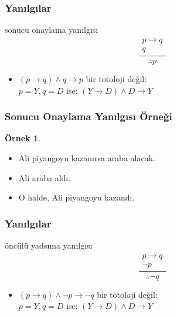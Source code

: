 \documentclass[dvipsnames]{beamer}
\theoremstyle{definition}
\theoremstyle{example}
\newtheorem{ornek}[theorem]{Örnek}
\theoremstyle{plain}
\begin{document}
\begin{frame}
  \frametitle{Yanılgılar}

  \begin{block}{sonucu onaylama yanılgısı}
    \[
    \frac
      {
      \begin{array}{c}
        p \rightarrow q\\
        q
        \end{array}
      }
      {
        \therefore p
      }
    \]
  \end{block}

  \pause
  \begin{itemize}
    \item $(p \rightarrow q) \wedge q \rightarrow p$ bir totoloji değil:\\
      $p=Y,q=D$ ise: $(Y \rightarrow D) \wedge D \rightarrow Y$
  \end{itemize}
\end{frame}

\begin{frame}
  \frametitle{Sonucu Onaylama Yanılgısı Örneği}

  \begin{ornek}
    \begin{itemize}
      \item Ali piyangoyu kazanırsa araba alacak.
      \item Ali araba aldı.

      \pause
      \medskip
      \item O halde, Ali piyangoyu kazandı.
    \end{itemize}
  \end{ornek}
\end{frame}

\begin{frame}
  \frametitle{Yanılgılar}

  \begin{block}{öncülü yadsıma yanılgısı}
    \[
    \frac
      {
        \begin{array}{c}
          p \rightarrow q\\
          \neg p
        \end{array}
      }
      {
        \therefore \neg q
      }
    \]
  \end{block}

  \pause
  \begin{itemize}
    \item $(p \rightarrow q) \wedge \neg p \rightarrow \neg q$ bir totoloji
      değil:\\
      $p=Y,q=D$ ise: $(Y \rightarrow D) \wedge D \rightarrow Y$
  \end{itemize}
\end{frame}
\end{document}
